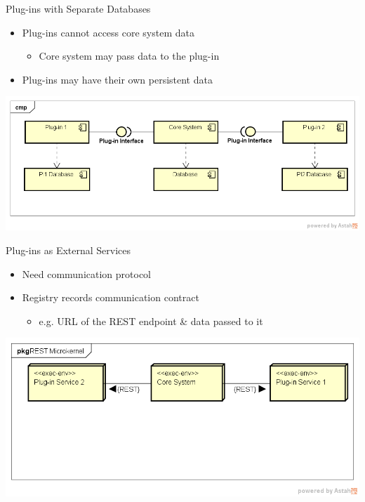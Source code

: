 \documentclass{slide}
\begin{document}

\begin{frame}{Plug-ins with Separate Databases}
    \begin{itemize}
        \LARGE\item Plug-ins cannot access core system data
        \begin{itemize}
            \Large\item Core system may pass data to the plug-in
        \end{itemize}
        \LARGE\item Plug-ins may have their own persistent data
    \end{itemize}
    \vspace{1cm}
    \includegraphics[trim=38 81 24 50,clip,width=\textwidth]{../../notes/microkernel/diagrams/plug-in-databases.png}
\end{frame}

\begin{frame}{Plug-ins as External Services}
    \begin{itemize}
        \LARGE\item Need communication protocol
        \LARGE\item Registry records communication contract
        \begin{itemize}
            \Large\item e.g. URL of the REST endpoint \& data passed to it
        \end{itemize}
    \end{itemize}
    \vspace{1cm}
    \includegraphics[trim=38 167 19 45,clip,width=\textwidth]{../../notes/microkernel/diagrams/rest-microkernel.png}
\end{frame}
\end{document}
